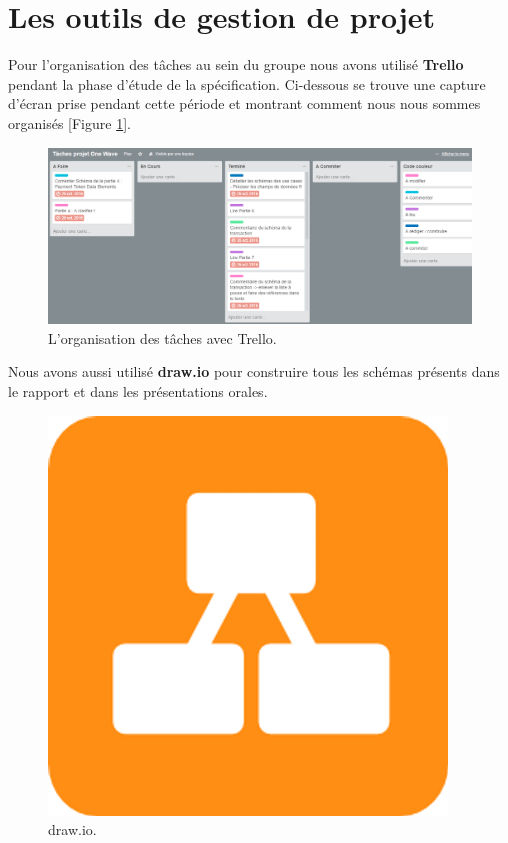\documentclass{report}
\begin{document}
\section{Les outils de gestion de projet}
Pour l'organisation des tâches au sein du groupe nous avons utilisé \textbf{Trello} pendant la phase d'étude de la spécification. Ci-dessous se trouve une capture d'écran prise pendant cette période et montrant comment nous nous sommes organisés [Figure \ref{Trello}]. 

\begin{figure}[!ht]
    \centering
			\includegraphics[scale=0.46]{img/trello.PNG}
			\caption{\label{Trello} L'organisation des tâches avec Trello.}			
\end{figure}

\newpage
\noindent
Nous avons aussi utilisé \textbf{draw.io} pour construire tous les schémas présents dans le rapport et dans les présentations orales.

\begin{figure}[!ht]
    \centering
			\includegraphics[scale=0.2]{img/draw.png}
			\caption{\label{Draw} draw.io.}			
\end{figure}
\end{document}
